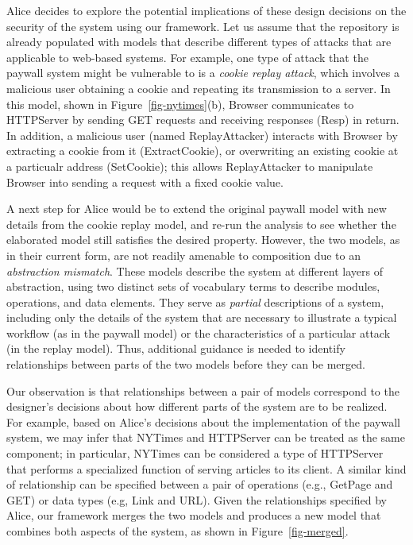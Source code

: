 Alice decides to explore the potential implications of these design
decisions on the security of the system using our framework. Let us
assume that the repository is already populated with models that
describe different types of attacks that are applicable to web-based
systems. For example, one type of attack that the paywall system might
be vulnerable to is a \textit{cookie replay attack}, which involves a
malicious user obtaining a cookie and repeating its transmission to a
server. In this model, shown in Figure~\ref{fig-nytimes}(b),
\textsf{Browser} communicates to \textsf{HTTPServer} by sending
\textsf{GET} requests and receiving responses (\textsf{Resp}) in
return. In addition, a malicious user (named \textsf{ReplayAttacker})
interacts with \textsf{Browser} by extracting a cookie from it
(\textsf{ExtractCookie}), or overwriting an existing cookie at a
particualr address (\textsf{SetCookie}); this allows
\textsf{ReplayAttacker} to manipulate \textsf{Browser} into sending a
request with a fixed cookie value.

A next step for Alice would be to extend the original paywall model
with new details from the cookie replay model, and re-run the analysis
to see whether the elaborated model still satisfies the desired
property. However, the two models, as in their current form, are not
readily amenable to composition due to an \textit{abstraction
  mismatch}. These models describe the system at different layers of
abstraction, using two distinct sets of vocabulary terms to describe
modules, operations, and data elements. They serve as \textit{partial}
descriptions of a system, including only the details of the system
that are necessary to illustrate a typical workflow (as in the paywall
model) or the characteristics of a particular attack (in the replay
model). Thus, additional guidance is needed to identify relationships
between parts of the two models before they can be merged.

Our observation is that relationships between a pair of models
correspond to the designer's decisions about how different parts of
the system are to be realized. For example, based on Alice's decisions
about the implementation of the paywall system, we may infer that
\textsf{NYTimes} and \textsf{HTTPServer} can be treated as the same
component; in particular, \textsf{NYTimes} can be considered a type of
\textsf{HTTPServer} that performs a specialized function of serving
articles to its client. A similar kind of relationship can be
specified between a pair of operations (e.g., \textsf{GetPage} and
\textsf{GET}) or data types (e.g, \textsf{Link} and \textsf{URL}). Given
the relationships specified by Alice, our framework merges the two
models and produces a new model that combines both aspects of the
system, as shown in Figure~\ref{fig-merged}.

